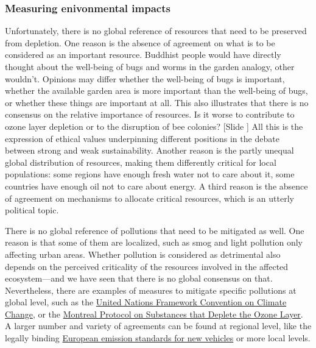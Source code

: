 \documentclass{article}
\newcounter{slide}
\begin{document}
\subsubsection{Measuring enivonmental impacts}
\label{sec:context}
Unfortunately, there is no global reference of resources that need to be preserved from depletion. One reason is the absence of agreement on what is to be considered as an important resource. Buddhist people would have directly thought about the well-being of bugs and worms in the garden analogy, other wouldn't. Opinions may differ whether the well-being of bugs is important, whether the available garden area is more important than the well-being of bugs, or whether these things are important at all. This also illustrates that there is no consensus on the relative importance of resources. Is it worse to contribute to ozone layer depletion or to the disruption of bee colonies? {\color{blue}[Slide ]} All this is the expression of ethical values underpinning different positions in the debate between strong and weak sustainability. Another reason is the partly unequal global distribution of resources, making them differently critical for local populations: some regions have enough fresh water not to care about it, some countries have enough oil not to care about energy. A third reason is the absence of agreement on mechanisms to allocate critical resources, which is an utterly political topic. 

There is no global reference of pollutions that need to be mitigated as well. One reason is that some of them are localized, such as smog and light pollution only affecting urban areas. Whether pollution is considered as detrimental also depends on the perceived criticality of the resources involved in the affected ecosystem---and we have seen that there is no global consensus on that. Nevertheless, there are examples of measures to mitigate specific pollutions at global level, such as the \href{https://en.wikipedia.org/wiki/United_Nations_Framework_Convention_on_Climate_Change}{United Nations Framework Convention on Climate Change}, or the \href{https://en.wikipedia.org/wiki/Montreal_Protocol}{Montreal Protocol on Substances that Deplete the Ozone Layer}. A larger number and variety of agreements can be found at regional level, like the legally binding \href{https://en.wikipedia.org/wiki/European_emission_standards}{European emission standards for new vehicles} or more local levels. 
\end{document}
